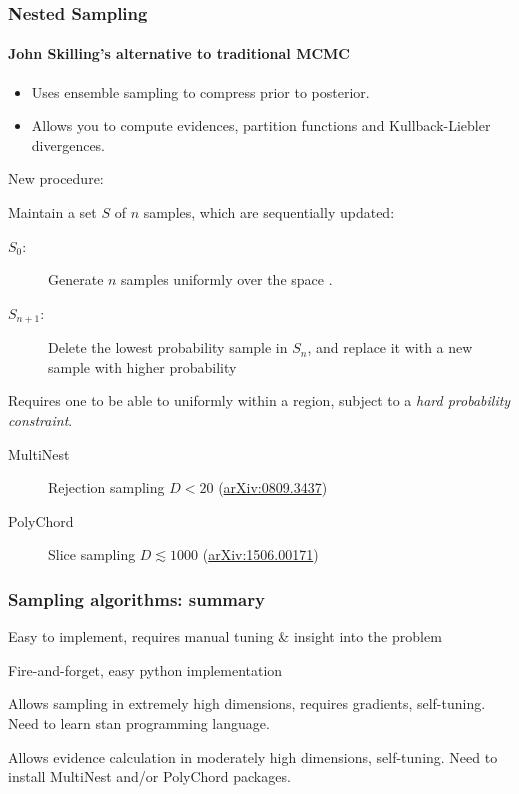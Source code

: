 \documentclass[%
]{beamer}
\begin{document}
\begin{frame}
  \frametitle{Nested Sampling} 
  \framesubtitle{John Skilling's alternative to traditional MCMC} 

  \begin{itemize}
    \item Uses ensemble sampling to compress prior to posterior.
    \item Allows you to compute evidences, partition functions and Kullback-Liebler divergences.
  \end{itemize}
  
  New procedure: 

  
  Maintain a set $S$ of $n$ samples, which are sequentially updated:

  \begin{description}
    \item[$S_0$:] Generate $n$ samples uniformly over the space . 
    \item[$S_{n+1}$:] Delete the lowest probability sample in $S_{n}$, and replace it with a new sample with higher probability
  \end{description}
  
  Requires one to be able to uniformly within a region, subject to a {\em hard probability constraint}.
  \begin{description}
      \item[MultiNest] Rejection sampling $D<20$ (\href{https://arxiv.org/abs/0809.3437}{arXiv:0809.3437})
      \item[PolyChord] Slice sampling $D\lesssim 1000$ (\href{https://arxiv.org/abs/1506.00171}{arXiv:1506.00171}) 
  \end{description}

\end{frame}

\begin{frame}
  \frametitle{Sampling algorithms: summary}
  \begin{description}
      \item[Metropolis Hastings] Easy to implement, requires manual tuning \& insight into the problem
      \item[emcee] Fire-and-forget, easy python implementation
      \item[Hamiltonian Monte Carlo] Allows sampling in extremely high dimensions, requires gradients, self-tuning. Need to learn stan programming language.
      \item[Nested Sampling] Allows evidence calculation in moderately high dimensions, self-tuning. Need to install MultiNest and/or PolyChord packages.
  \end{description}
\end{frame}
\end{document}
